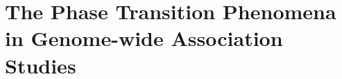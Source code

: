 \documentclass[graybox,envcountchap,sectrefs]{svmono}
\begin{document}
\chapter{The Phase Transition Phenomena in Genome-wide Association Studies} 
\label{chap:GWAS}





%
%
%

\backmatter%

%
%
\printindex



\end{document}
